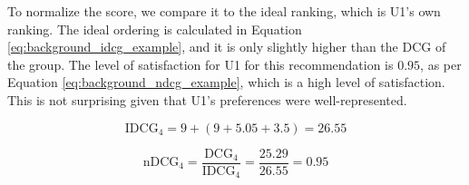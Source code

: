 To normalize the score, we compare it to the ideal ranking, which is U1's own ranking. The ideal ordering is calculated in Equation \ref{eq:background_idcg_example}, and it is only slightly higher than the DCG of the group. The level of satisfaction for U1 for this recommendation is $0.95$, as per Equation \ref{eq:background_ndcg_example}, which is a high level of satisfaction. This is not surprising given that U1's preferences were well-represented.

\begin{equation}\label{eq:background_idcg_example}
\text{IDCG}_4 = 9 + (9 + 5.05 + 3.5) = 26.55
\end{equation}

\begin{equation}\label{eq:background_ndcg_example}
\text{nDCG}_4 = \frac{\text{DCG}_4}{\text{IDCG}_4} = \frac{25.29}{26.55}=0.95
\end{equation}